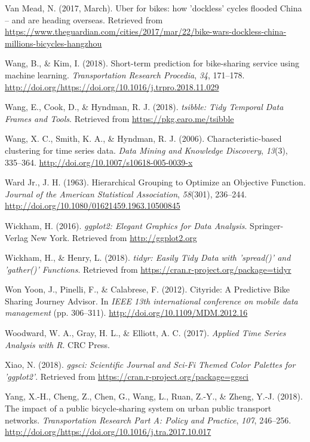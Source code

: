 \documentclass[12pt,oneside]{reedthesis}
\begin{document}
\hypertarget{ref-guardian1}{}
Van Mead, N. (2017, March). Uber for bikes: how 'dockless' cycles
flooded China -- and are heading overseas. Retrieved from
\url{https://www.theguardian.com/cities/2017/mar/22/bike-wars-dockless-china-millions-bicycles-hangzhou}

\hypertarget{ref-wang2018}{}
Wang, B., \& Kim, I. (2018). Short-term prediction for bike-sharing
service using machine learning. \emph{Transportation Research Procedia},
\emph{34}, 171--178.
\url{http://doi.org/https://doi.org/10.1016/j.trpro.2018.11.029}

\hypertarget{ref-tsibble}{}
Wang, E., Cook, D., \& Hyndman, R. J. (2018). \emph{tsibble: Tidy
Temporal Data Frames and Tools}. Retrieved from
\url{https://pkg.earo.me/tsibble}

\hypertarget{ref-wang2006}{}
Wang, X. C., Smith, K. A., \& Hyndman, R. J. (2006).
Characteristic-based clustering for time series data. \emph{Data Mining
and Knowledge Discovery}, \emph{13}(3), 335--364.
\url{http://doi.org/10.1007/s10618-005-0039-x}

\hypertarget{ref-ward1963}{}
Ward Jr., J. H. (1963). Hierarchical Grouping to Optimize an Objective
Function. \emph{Journal of the American Statistical Association},
\emph{58}(301), 236--244.
\url{http://doi.org/10.1080/01621459.1963.10500845}

\hypertarget{ref-ggplot}{}
Wickham, H. (2016). \emph{ggplot2: Elegant Graphics for Data Analysis}.
Springer-Verlag New York. Retrieved from \url{http://ggplot2.org}

\hypertarget{ref-tidyr}{}
Wickham, H., \& Henry, L. (2018). \emph{tidyr: Easily Tidy Data with
'spread()' and 'gather()' Functions}. Retrieved from
\url{https://cran.r-project.org/package=tidyr}

\hypertarget{ref-won2012}{}
Won Yoon, J., Pinelli, F., \& Calabrese, F. (2012). Cityride: A
Predictive Bike Sharing Journey Advisor. In \emph{IEEE 13th
international conference on mobile data management} (pp. 306--311).
\url{http://doi.org/10.1109/MDM.2012.16}

\hypertarget{ref-woodward2017}{}
Woodward, W. A., Gray, H. L., \& Elliott, A. C. (2017). \emph{Applied
Time Series Analysis with R}. CRC Press.

\hypertarget{ref-ggsci}{}
Xiao, N. (2018). \emph{ggsci: Scientific Journal and Sci-Fi Themed Color
Palettes for 'ggplot2'}. Retrieved from
\url{https://cran.r-project.org/package=ggsci}

\hypertarget{ref-yang2018}{}
Yang, X.-H., Cheng, Z., Chen, G., Wang, L., Ruan, Z.-Y., \& Zheng, Y.-J.
(2018). The impact of a public bicycle-sharing system on urban public
transport networks. \emph{Transportation Research Part A: Policy and
Practice}, \emph{107}, 246--256.
\url{http://doi.org/https://doi.org/10.1016/j.tra.2017.10.017}
\end{document}
